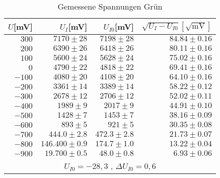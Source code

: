 \begin{table}[h!]
  \centering
  \caption{Gemessene Spannungen Grün}
    \begin{tabular}{r | r | r | r}
        \toprule
    $U$[mV] & $U_I$[mV] & $U_{I0}$[mV] & $\sqrt{U_I  - U_{I0}}[\sqrt{\text{mV}}]$\\
    \midrule
    $300$&$7170 \pm 28$ & $7198 \pm 28$ & $84.84 \pm 0.16$ \\
    $200$&$6390 \pm 26$ & $6418 \pm 26$ & $80.11 \pm 0.16$ \\
    $100$&$5600\pm 24 $   &$ 5628 \pm 24$ & $75.02 \pm 0.16$ \\
    $0$&$4790 \pm 22$ & $4818\pm 22$ & $69.41\pm 0.16 $\\
    $-100$&$4080 \pm 20 $ & $4108 \pm 20$ & $64.10 \pm 0.16 $\\
    $-200$&$3361  \pm 14$ & $3389 \pm 14$ & $58.22 \pm 0.12$ \\
    $-300$&$2678 \pm 12$ & $2706 \pm 12$ & $52.02 \pm 0.11 $\\
    $-400$&$1989 \pm 9 $& $2017 \pm 9$ & $44.91\pm 0.10$ \\
    $-500$&$1428 \pm 7$ & $1453 \pm 7$ & $38.16 \pm 0.09$ \\
    $-600$&$893 \pm 5$ & $921 \pm 5$ & $30.35 \pm 0.08$ \\
    $-700$&$444.0 \pm 2.8$ & $472.3 \pm 2.8$ & $21.73 \pm 0.07$ \\
    $-800$&$146.400 \pm 0.9$ & $174.7 \pm 1.0$ & $13.22 \pm 0.04$ \\
    $-900$&$19.700 \pm 0.5$ & $48.0    \pm 0.8 $& $6.93 \pm 0.06 $\\
    \bottomrule
    \multicolumn{4}{c}{$U_{I0} = -28,3$ , $\Delta U_{I0} = 0,6$}
    \end{tabular}%
\end{table}%



